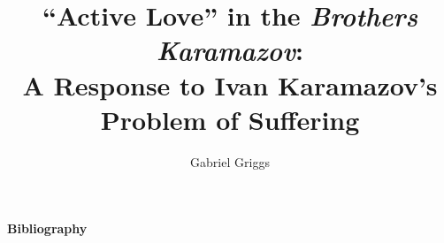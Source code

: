 \documentclass[12pt]{report}
\begin{document}
    
       \graduationmonth{}
       \graduationyear{}
       \author{Gabriel Griggs}
       \committee{}{}{}{}{}
       \title{``Active Love'' in the \emph{Brothers Karamazov}: \\ A Response to Ivan Karamazov's Problem of Suffering}


          \titlepage


\begin{acknowledgements}

     

\end{acknowledgements}

\pagebreak
\begingroup
\renewcommand{\section}[2]{}	%
\centerline{\textbf{Bibliography}} 
\end{document}
